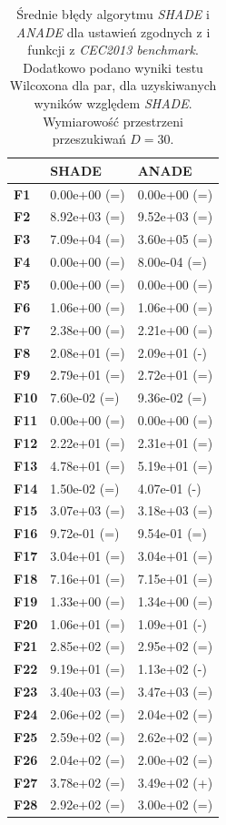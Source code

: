 \documentclass[12pt,a4paper]{report}
\begin{document}
{{{{{{{\begin{table}[h]
\centering
\caption{Średnie błędy algorytmu \emph{SHADE} i \emph{ANADE} dla ustawień zgodnych z \cite{SHADE} i funkcji z \emph{CEC2013 benchmark}. Dodatkowo podano wyniki testu Wilcoxona dla par, dla uzyskiwanych wyników względem \emph{SHADE}. Wymiarowość przestrzeni przeszukiwań $D = 30$.}
\label{Eksp5}
\begin{tabular}{|l|l|l|}
\hline
          & {\bf SHADE}  & {\bf ANADE}  \\ \hline
{\bf F1}  & 0.00e+00 (=) & 0.00e+00 (=) \\ \hline
{\bf F2}  & 8.92e+03 (=) & 9.52e+03 (=) \\ \hline
{\bf F3}  & 7.09e+04 (=) & 3.60e+05 (=) \\ \hline
{\bf F4}  & 0.00e+00 (=) & 8.00e-04 (=) \\ \hline
{\bf F5}  & 0.00e+00 (=) & 0.00e+00 (=) \\ \hline
{\bf F6}  & 1.06e+00 (=) & 1.06e+00 (=) \\ \hline
{\bf F7}  & 2.38e+00 (=) & 2.21e+00 (=) \\ \hline
{\bf F8}  & 2.08e+01 (=) & 2.09e+01 (-) \\ \hline
{\bf F9}  & 2.79e+01 (=) & 2.72e+01 (=) \\ \hline
{\bf F10} & 7.60e-02 (=) & 9.36e-02 (=) \\ \hline
{\bf F11} & 0.00e+00 (=) & 0.00e+00 (=) \\ \hline
{\bf F12} & 2.22e+01 (=) & 2.31e+01 (=) \\ \hline
{\bf F13} & 4.78e+01 (=) & 5.19e+01 (=) \\ \hline
{\bf F14} & 1.50e-02 (=) & 4.07e-01 (-) \\ \hline
{\bf F15} & 3.07e+03 (=) & 3.18e+03 (=) \\ \hline
{\bf F16} & 9.72e-01 (=) & 9.54e-01 (=) \\ \hline
{\bf F17} & 3.04e+01 (=) & 3.04e+01 (=) \\ \hline
{\bf F18} & 7.16e+01 (=) & 7.15e+01 (=) \\ \hline
{\bf F19} & 1.33e+00 (=) & 1.34e+00 (=) \\ \hline
{\bf F20} & 1.06e+01 (=) & 1.09e+01 (-) \\ \hline
{\bf F21} & 2.85e+02 (=) & 2.95e+02 (=) \\ \hline
{\bf F22} & 9.19e+01 (=) & 1.13e+02 (-) \\ \hline
{\bf F23} & 3.40e+03 (=) & 3.47e+03 (=) \\ \hline
{\bf F24} & 2.06e+02 (=) & 2.04e+02 (=) \\ \hline
{\bf F25} & 2.59e+02 (=) & 2.62e+02 (=) \\ \hline
{\bf F26} & 2.04e+02 (=) & 2.00e+02 (=) \\ \hline
{\bf F27} & 3.78e+02 (=) & 3.49e+02 (+) \\ \hline
{\bf F28} & 2.92e+02 (=) & 3.00e+02 (=) \\ \hline
\end{tabular}
\end{table}


}}}}}}}
\end{document}
